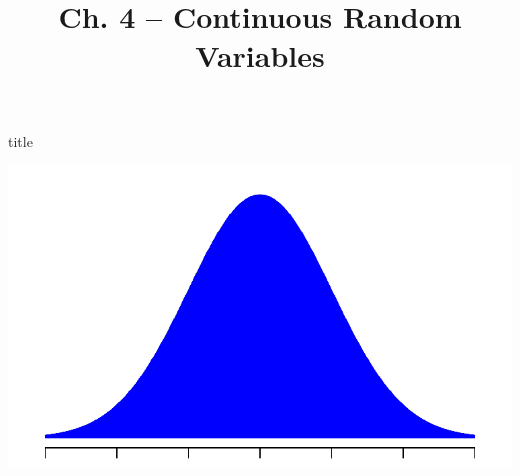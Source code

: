 \documentclass{beamer}
\title{Ch. 4 -- Continuous Random Variables}
\renewcommand{\emph}{\textbf}
\begin{document}
\begin{frame}
\begin{beamercolorbox}[rounded=true,wd=\textwidth,center]{title}
\inserttitle
\end{beamercolorbox}
\begin{center}
\includegraphics[scale=.7]{ch4_cdf_norm3.pdf}
\end{center}
\end{frame} 

%
%
\end{document}
